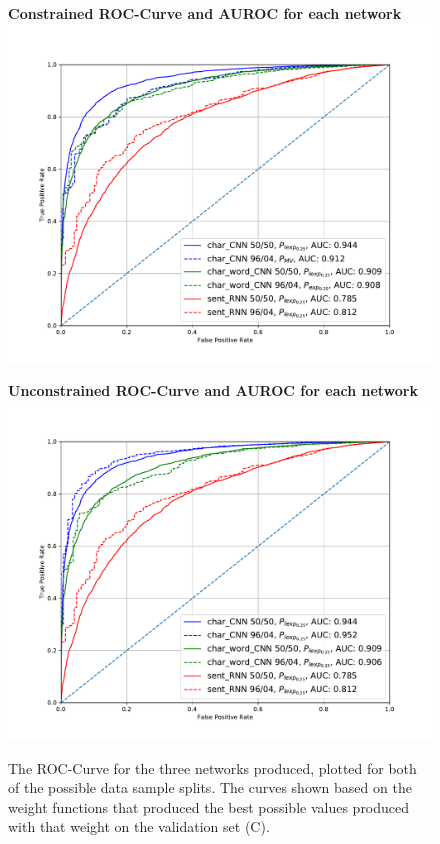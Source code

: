 \begin{figure}
\centering
\begin{minipage}{.5\textwidth}
  \centering
    \textbf{Constrained ROC-Curve and AUROC for each network}
  \includegraphics[width=1\linewidth]{./pictures/discussion/AUROC_Constrained}
\end{minipage}%
\begin{minipage}{.5\textwidth}
  \centering
    \textbf{Unconstrained ROC-Curve and AUROC for each network}
  \includegraphics[width=1\linewidth]{./pictures/discussion/AUROC_Unconstrained}
\end{minipage}
\caption{The ROC-Curve for the three networks produced, plotted for both of the
possible data sample splits. The curves shown based on the weight functions that
produced the best possible values produced with that weight on the validation
set (C). }
\label{fig:AUROC}
\end{figure}

